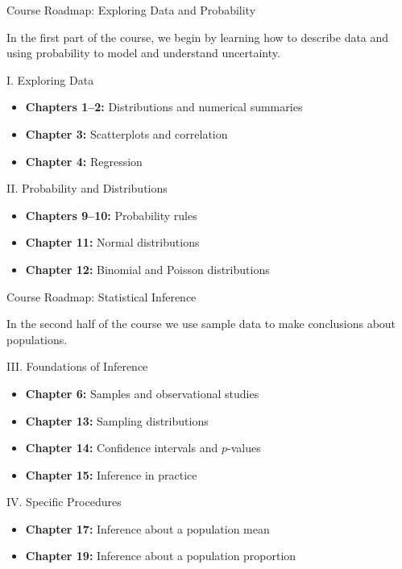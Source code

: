 \documentclass[aspectratio=169,10pt]{beamer}
\begin{document}
\begin{frame}{Course Roadmap: Exploring Data and Probability}

\large In the first part of the course, we begin by learning how to describe data and using probability to model and understand uncertainty.

  \begin{block}{I. Exploring Data}
    \begin{itemize}
      \item \textbf{Chapters 1--2:} Distributions and numerical summaries
      \item \textbf{Chapter 3:} Scatterplots and correlation
      \item \textbf{Chapter 4:} Regression
    \end{itemize}
  \end{block}

  \begin{block}{II. Probability and Distributions}
    \begin{itemize}
      \item \textbf{Chapters 9--10:} Probability rules
      \item \textbf{Chapter 11:} Normal distributions
      \item \textbf{Chapter 12:} Binomial and Poisson distributions
    \end{itemize}
  \end{block}

\end{frame}


\begin{frame}{Course Roadmap: Statistical Inference}

\large In the second half of the course we use sample data to make conclusions about populations.

  \begin{block}{III. Foundations of Inference}
    \begin{itemize}
      \item \textbf{Chapter 6:} Samples and observational studies
      \item \textbf{Chapter 13:} Sampling distributions
      \item \textbf{Chapter 14:} Confidence intervals and $p$-values
      \item \textbf{Chapter 15:} Inference in practice
    \end{itemize}
  \end{block}

  \begin{block}{IV. Specific Procedures}
    \begin{itemize}
      \item \textbf{Chapter 17:} Inference about a population mean
      \item \textbf{Chapter 19:} Inference about a population proportion
    \end{itemize}
  \end{block}

\end{frame}
\end{document}
